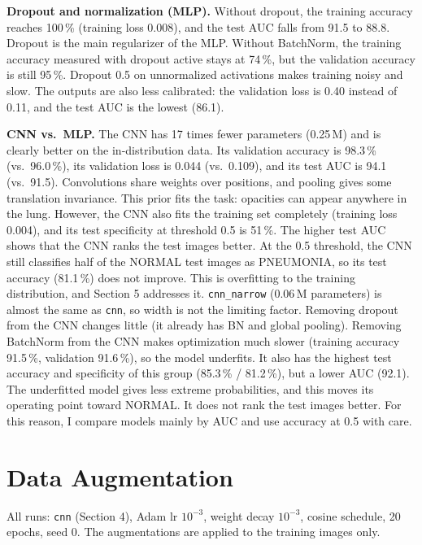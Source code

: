 \documentclass[10pt]{article}
\begin{document}
\textbf{Dropout and normalization (MLP).} Without dropout, the training accuracy reaches 100\,\% (training loss 0.008), and the test AUC falls from 91.5 to 88.8. Dropout is the main regularizer of the MLP.
Without BatchNorm, the training accuracy measured with dropout active stays at 74\,\%, but the validation accuracy is still 95\,\%. Dropout 0.5 on unnormalized activations makes training noisy and slow.
The outputs are also less calibrated: the validation loss is 0.40 instead of 0.11, and the test AUC is the lowest (86.1).

\textbf{CNN vs.\ MLP.} The CNN has 17 times fewer parameters (0.25\,M) and is clearly better on the in-distribution data. Its validation accuracy is 98.3\,\% (vs.\ 96.0\,\%), its validation loss is 0.044 (vs.\ 0.109), and its test AUC is 94.1 (vs.\ 91.5).
Convolutions share weights over positions, and pooling gives some translation invariance. This prior fits the task: opacities can appear anywhere in the lung.
However, the CNN also fits the training set completely (training loss 0.004), and its test specificity at threshold 0.5 is 51\,\%. The higher test AUC shows that the CNN ranks the test images better.
At the 0.5 threshold, the CNN still classifies half of the NORMAL test images as PNEUMONIA, so its test accuracy (81.1\,\%) does not improve. This is overfitting to the training distribution, and Section 5 addresses it.
\texttt{cnn\_narrow} (0.06\,M parameters) is almost the same as \texttt{cnn}, so width is not the limiting factor.
Removing dropout from the CNN changes little (it already has BN and global pooling).
Removing BatchNorm from the CNN makes optimization much slower (training accuracy 91.5\,\%, validation 91.6\,\%), so the model underfits.
It also has the highest test accuracy and specificity of this group (85.3\,\% / 81.2\,\%), but a lower AUC (92.1).
The underfitted model gives less extreme probabilities, and this moves its operating point toward NORMAL. It does not rank the test images better.
For this reason, I compare models mainly by AUC and use accuracy at 0.5 with care.

\section{Data Augmentation}
All runs: \texttt{cnn} (Section 4), Adam lr $10^{-3}$, weight decay $10^{-3}$, cosine schedule, 20 epochs, seed 0.
The augmentations are applied to the training images only.
\end{document}
